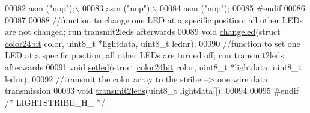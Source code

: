\begin{DoxyCode}
00082 \textcolor{preprocessor}{               asm ("nop");\(\backslash\)}
00083 \textcolor{preprocessor}{               asm ("nop");\(\backslash\)}
00084 \textcolor{preprocessor}{               asm ("nop");}
00085 \textcolor{preprocessor}{#endif}
00086 
00087 
00088 \textcolor{comment}{//function to change one LED at a specific position; all other LEDs are not changed; run transmit2leds
       afterwards}
00089 \textcolor{keywordtype}{void} \hyperlink{_lightstribe_8h_a63fa595d401f0e85c1bba55ba2b1d66e}{changeled}(\textcolor{keyword}{struct} \hyperlink{structcolor24bit}{color24bit} color, uint8\_t *lightdata, uint8\_t lednr);
00090 \textcolor{comment}{//function to set one LED at a specific position; all other LEDs are turned off; run transmit2leds
       afterwards}
00091 \textcolor{keywordtype}{void} \hyperlink{_lightstribe_8h_abba9462833e30ef725eaf18c3d01eb71}{setled}(\textcolor{keyword}{struct} \hyperlink{structcolor24bit}{color24bit} color, uint8\_t *lightdata, uint8\_t lednr);
00092 \textcolor{comment}{//transmit the color array to the stribe --> one wire data transmission}
00093 \textcolor{keywordtype}{void} \hyperlink{_lightstribe_8h_aac724dad670e4a26723daf71ce6a8d8a}{transmit2leds}(uint8\_t lightdata[]);
00094 
00095 \textcolor{preprocessor}{#endif }\textcolor{comment}{/* LIGHTSTRIBE\_H\_ */}\textcolor{preprocessor}{}
\end{DoxyCode}
